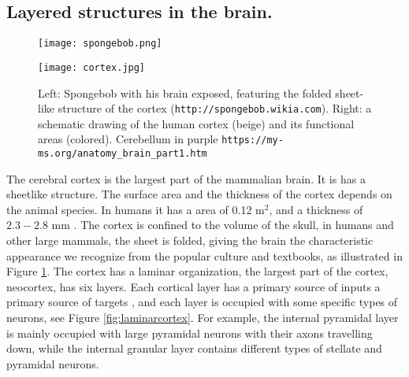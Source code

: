 \documentclass{article}
\begin{document}
\subsection{Layered structures in the brain.}\label{Layered structures}
\begin{figure}[!tbp]
  \centering
  \begin{minipage}[b]{0.4\textwidth}
    \texttt{[image: spongebob.png]}
  \end{minipage}
  \begin{minipage}[b]{0.5\textwidth}
    \texttt{[image: cortex.jpg]}
  \end{minipage}  
   \caption{Left: Spongebob with his brain exposed, featuring the folded sheet-like structure of the cortex (\texttt{http://spongebob.wikia.com}). Right: a schematic drawing of the human cortex (beige) and its functional areas (colored). Cerebellum in purple \texttt{https://my-ms.org/anatomy\_brain\_part1.htm}}
  \label{fig:spongebob}
\end{figure}

The cerebral cortex is the largest part of the mammalian brain. It is has a sheetlike structure. The surface area and the thickness of the cortex depends on the animal species. In humans it has a area of 0.12 m$^2$, and a thickness of $2.3 - 2.8$ mm \cite{wikipedia}. The cortex is confined to the volume of the skull, in humans and other large mammals, the sheet is folded, giving the brain the characteristic appearance we recognize from the popular culture and textbooks, as illustrated in Figure  \ref{fig:spongebob}.  The cortex has a laminar organization, the largest part of the cortex, neocortex, has six layers. Each cortical layer has a primary source of inputs a primary source of targets \cite{Neuroscience}, and each layer is occupied with some specific types of neurons, see Figure \ref{fig:laminarcortex}. For example, the internal pyramidal layer is mainly occupied with large pyramidal neurons with their axons travelling down, while the  internal granular layer contains different types of stellate and pyramidal neurons. 
\end{document}
